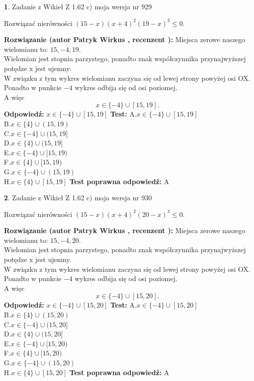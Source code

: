 \documentclass[12pt, a4paper]{article}
\theoremstyle{definition} %
\newtheorem{zad}{}
\newcommand{\zadStart}[1]{\begin{zad}#1\newline}
\newcommand{\zadStop}{\end{zad}}
\newcommand{\rozwStart}[2]{\noindent \textbf{Rozwiązanie (autor #1 , recenzent #2): }\newline}
\newcommand{\rozwStop}{\newline}
\newcommand{\odpStart}{\noindent \textbf{Odpowiedź:}\newline}
\newcommand{\odpStop}{\newline}
\newcommand{\testStart}{\noindent \textbf{Test:}\newline}
\newcommand{\testStop}{\newline}
\newcommand{\kluczStart}{\noindent \textbf{Test poprawna odpowiedź:}\newline}
\newcommand{\kluczStop}{\newline}
\begin{document}
\zadStart{Zadanie z Wikieł Z 1.62 c) moja wersja nr 929}

Rozwiązać nierówności $(15-x)(x+4)^{2}(19-x)^{3}\le0$.
\zadStop
\rozwStart{Patryk Wirkus}{}
Miejsca zerowe naszego wielomianu to: $15, -4, 19$.\\
Wielomian jest stopnia parzystego, ponadto znak współczynnika przy\linebreak najwyższej potędze x jest ujemny.\\ W związku z tym wykres wielomianu zaczyna się od lewej strony powyżej osi OX.\\
Ponadto w punkcie $-4$ wykres odbija się od osi poziomej.\\
A więc $$x \in \{-4\} \cup [15,19].$$
\rozwStop
\odpStart
$x \in \{-4\} \cup [15,19]$
\odpStop
\testStart
A.$x \in \{-4\} \cup [15,19]$\\
B.$x \in \{4\} \cup (15,19)$\\
C.$x \in \{-4\} \cup (15,19]$\\
D.$x \in \{4\} \cup (15,19]$\\
E.$x \in \{-4\} \cup [15,19)$\\
F.$x \in \{4\} \cup [15,19)$\\
G.$x \in \{-4\} \cup (15,19)$\\
H.$x \in \{4\} \cup [15,19]$
\testStop
\kluczStart
A
\kluczStop



\zadStart{Zadanie z Wikieł Z 1.62 c) moja wersja nr 930}

Rozwiązać nierówności $(15-x)(x+4)^{2}(20-x)^{3}\le0$.
\zadStop
\rozwStart{Patryk Wirkus}{}
Miejsca zerowe naszego wielomianu to: $15, -4, 20$.\\
Wielomian jest stopnia parzystego, ponadto znak współczynnika przy\linebreak najwyższej potędze x jest ujemny.\\ W związku z tym wykres wielomianu zaczyna się od lewej strony powyżej osi OX.\\
Ponadto w punkcie $-4$ wykres odbija się od osi poziomej.\\
A więc $$x \in \{-4\} \cup [15,20].$$
\rozwStop
\odpStart
$x \in \{-4\} \cup [15,20]$
\odpStop
\testStart
A.$x \in \{-4\} \cup [15,20]$\\
B.$x \in \{4\} \cup (15,20)$\\
C.$x \in \{-4\} \cup (15,20]$\\
D.$x \in \{4\} \cup (15,20]$\\
E.$x \in \{-4\} \cup [15,20)$\\
F.$x \in \{4\} \cup [15,20)$\\
G.$x \in \{-4\} \cup (15,20)$\\
H.$x \in \{4\} \cup [15,20]$
\testStop
\kluczStart
A
\kluczStop
\end{document}
